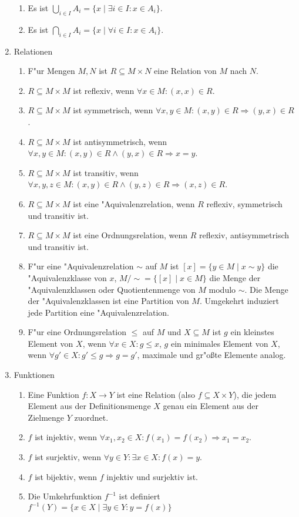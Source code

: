 \begin{enumerate}
\begin{enumerate}
    \item Es ist $\bigcup_{i\in I}A_i = \{x\mid \exists i\in I: x\in A_i\}$. 
    \item Es ist $\bigcap_{i\in I}A_i = \{x\mid\forall i\in I: x\in A_i\}$.
\end{enumerate}
\item Relationen
\begin{enumerate}
    \item F"ur Mengen $M,N$ ist $R\subseteq M\times N$ eine Relation von $M$ nach $N$.
    \item $R\subseteq M\times M$ ist reflexiv, wenn $\forall x\in M: (x,x)\in R$.
    \item $R\subseteq M\times M$ ist symmetrisch, wenn $\forall x,y\in M: (x,y)\in R \Rightarrow (y,x)\in R$.
    \item $R\subseteq M\times M$ ist antisymmetrisch, wenn $\forall x,y\in M: (x,y)\in R \wedge (y,x)\in R \Rightarrow x=y$.
    \item $R\subseteq M\times M$ ist transitiv, wenn $\forall x,y,z\in M: (x,y)\in R \wedge (y,z)\in R \Rightarrow (x,z)\in R$.
    \item $R\subseteq M\times M$ ist eine "Aquivalenzrelation, wenn $R$ reflexiv, symmetrisch und transitiv ist.
    \item $R\subseteq M\times M$ ist eine Ordnungsrelation, wenn $R$ reflexiv, antisymmetrisch und transitiv ist.
    \item F"ur eine "Aquivalenzrelation $\sim$ auf $M$ ist $[x]=\{y\in M\mid x\sim y\}$ die "Aquivalenzklasse von $x$, $M/\sim = \{[x]\mid x\in M\}$ die Menge der "Aquivalenzklassen oder Quotientenmenge von $M$ modulo $\sim$. Die Menge der "Aquivalenzklassen ist eine Partition von $M$. Umgekehrt induziert jede Partition eine "Aquivalenzrelation.
    \item F"ur eine Ordnungsrelation $\leq$ auf $M$ und $X\subseteq M$ ist $g$ ein kleinstes Element von $X$, wenn $\forall x\in X: g\leq x$, $g$ ein minimales Element von $X$, wenn $\forall g'\in X: g'\leq g\Rightarrow g=g'$, maximale und gr"o{\ss}te Elemente analog.
\end{enumerate}
\item Funktionen
\begin{enumerate}
    \item Eine Funktion $f:X\to Y$ ist eine Relation (also $f\subseteq X\times Y$), die jedem Element aus der Definitionsmenge $X$ genau ein Element aus der Zielmenge $Y$ zuordnet.
    \item $f$ ist injektiv, wenn $\forall x_1,x_2\in X: f(x_1)=f(x_2) \Rightarrow x_1=x_2$.
    \item $f$ ist surjektiv, wenn $\forall y\in Y: \exists x\in X: f(x)=y$.
    \item $f$ ist bijektiv, wenn $f$ injektiv und surjektiv ist.
    \item Die Umkehrfunktion $f^{-1}$ ist definiert $f^{-1}(Y)=\{x\in X\mid\exists y\in Y: y=f(x)\}$
\end{enumerate}
\end{enumerate}
